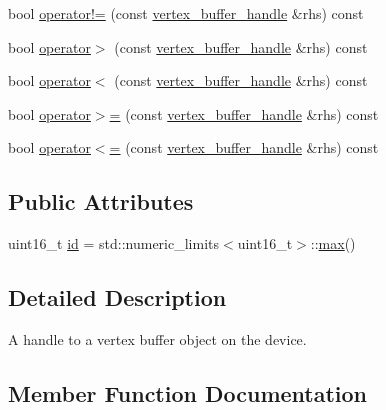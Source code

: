 \begin{DoxyCompactItemize}
\item 
bool \mbox{\hyperlink{structmoka_1_1vertex__buffer__handle_a864be1ddc3374ffcaccc9712b04829d7}{operator!=}} (const \mbox{\hyperlink{structmoka_1_1vertex__buffer__handle}{vertex\+\_\+buffer\+\_\+handle}} \&rhs) const
\item 
bool \mbox{\hyperlink{structmoka_1_1vertex__buffer__handle_a7fd7827b31829ef4bf4bf695457e5c24}{operator$>$}} (const \mbox{\hyperlink{structmoka_1_1vertex__buffer__handle}{vertex\+\_\+buffer\+\_\+handle}} \&rhs) const
\item 
bool \mbox{\hyperlink{structmoka_1_1vertex__buffer__handle_ae68b95f114abecd5e9c15fd334fa8fe1}{operator$<$}} (const \mbox{\hyperlink{structmoka_1_1vertex__buffer__handle}{vertex\+\_\+buffer\+\_\+handle}} \&rhs) const
\item 
bool \mbox{\hyperlink{structmoka_1_1vertex__buffer__handle_ab3b1d0b7656cc1e6e7d68a383d5ceae8}{operator$>$=}} (const \mbox{\hyperlink{structmoka_1_1vertex__buffer__handle}{vertex\+\_\+buffer\+\_\+handle}} \&rhs) const
\item 
bool \mbox{\hyperlink{structmoka_1_1vertex__buffer__handle_ad3f3043c57891760b8ec93678944e4c1}{operator$<$=}} (const \mbox{\hyperlink{structmoka_1_1vertex__buffer__handle}{vertex\+\_\+buffer\+\_\+handle}} \&rhs) const
\end{DoxyCompactItemize}
\subsection*{Public Attributes}
\begin{DoxyCompactItemize}
\item 
uint16\+\_\+t \mbox{\hyperlink{structmoka_1_1vertex__buffer__handle_ae6ce2ad9ec43d66727c59f9ecce6d4fb}{id}} = std\+::numeric\+\_\+limits$<$uint16\+\_\+t$>$\+::\mbox{\hyperlink{namespacemoka_acf03408f89c521244763fb5f8746ce16a2ffe4e77325d9a7152f7086ea7aa5114}{max}}()
\end{DoxyCompactItemize}


\subsection{Detailed Description}
A handle to a vertex buffer object on the device. 

\subsection{Member Function Documentation}
\mbox{\label{structmoka_1_1vertex__buffer__handle_ae37df1442dde2a0b71e4e67d361bbad9}} 
